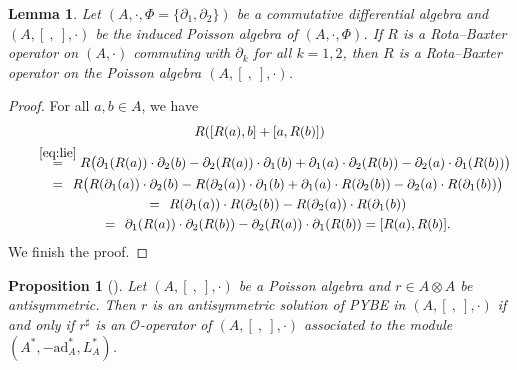 \documentclass[pdftex]{sigma}
\numberwithin{equation}{section}
\newtheorem{Lemma}[Theorem]{Lemma}
\newtheorem{Proposition}[Theorem]{Proposition}
{ \theoremstyle{definition}
	\newtheorem{Definition}[Theorem]{Definition}
	\newtheorem{Note}[Theorem]{Note}
	\newtheorem{Example}[Theorem]{Example}
	\newtheorem{Remark}[Theorem]{Remark} }
\newcommand{\ad}{\mathrm{ad}}
\begin{document}
\begin{Lemma}\label{lem:rod}
 Let $(A, \cdot, \Phi = \{\partial_1, \partial_2\})$ be a commutative differential algebra and
 $(A, [\ ,\ ], \cdot)$ be the induced Poisson algebra of $(A, \cdot, \Phi)$.
 If $R$ is a Rota--Baxter operator on $(A, \cdot)$ commuting with $\partial_k$ for all $k=1,2$, then $R$ is a Rota--Baxter operator on the Poisson algebra $(A, [\ ,\ ], \cdot)$.
\end{Lemma}
\begin{proof}
 For all $a, b \in A$, we have
 \begin{gather*}
 R([R(a), b] + [a, R(b)]) \\
\qquad{} \overset{\eqref{eq:lie}}{=} R\big(\partial_1(R(a)) \cdot \partial_2(b) - \partial_2(R(a)) \cdot \partial_1(b) + \partial_1(a) \cdot \partial_2(R(b)) - \partial_2(a) \cdot \partial_1(R(b))\big) \\
\qquad{} \overset{\hphantom{(5.1)}}{=} R\big(R(\partial_1(a)) \cdot \partial_2(b) - R(\partial_2(a)) \cdot \partial_1(b) + \partial_1(a) \cdot R(\partial_2(b)) - \partial_2(a) \cdot R(\partial_1(b))\big) \\
 \qquad{}\overset{\hphantom{(5.1)}}{=} R(\partial_1(a)) \cdot R(\partial_2(b)) - R(\partial_2(a)) \cdot R(\partial_1(b)) \\
 \qquad{}\overset{\hphantom{(5.1)}}{=} \partial_1(R(a)) \cdot \partial_2(R(b)) - \partial_2(R(a)) \cdot \partial_1(R(b)) = [R(a), R(b)].
	\end{gather*}
 We finish the proof.
\end{proof}

\begin{Proposition}[{\cite[Proposition~A.6, Theorem~2.4.7]{BaiDouble}}]\label{pro:pybe_o}
 Let $(A, [\ ,\ ], \cdot)$ be a Poisson algebra and $r \in A \otimes A$ be antisymmetric.
 Then $r$ is an antisymmetric solution of PYBE in $(A, [\ ,\ ], \cdot)$ if and only if $r^\sharp$ is an $\mathcal{O}$-operator of $(A, [\ ,\ ], \cdot)$ associated to the module $(A^*, -\ad_A^*, L_A^*)$.
\end{Proposition}
\end{document}
